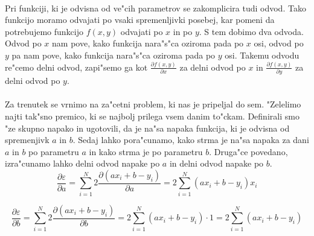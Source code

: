 \paragraph{}
Pri funkciji, ki je odvisna od ve"cih parametrov se zakomplicira tudi odvod. Tako funkcijo moramo odvajati po vsaki spremenljivki posebej, kar pomeni da potrebujemo funkcijo $f(x,y)$ odvajati po $x$ in po $y$. S tem dobimo dva odvoda. Odvod po $x$ nam pove, kako funkcija nara"s"ca oziroma pada po $x$ osi, odvod po $y$ pa nam pove, kako funkcija nara"s"ca oziroma pada po $y$ osi. Takemu odvodu re"cemo delni odvod, zapi"semo ga kot $\frac{\partial f(x,y)}{\partial x}$ za delni odvod po $x$ in $\frac{\partial f(x,y)}{\partial y}$ za delni odvod po $y$.

\paragraph{}
Za trenutek se vrnimo na za"cetni problem, ki nas je pripeljal do sem. "Zelelimo najti tak"sno premico, ki se najbolj prilega vsem danim to"ckam. Definirali smo "ze skupno napako in ugotovili, da je na"sa napaka funkcija, ki je odvisna od spremenjivk $a$ in $b$. Sedaj lahko pora"cunamo, kako strma je na"sa napaka za dani $a$ in $b$ po parametru $a$ in kako strma je po parametru $b$. Druga"ce povedano, izra"cunamo lahko delni odvod napake po $a$ in delni odvod napake po $b$.
$$\frac{\partial \varepsilon}{\partial a} =
\sum_{i=1}^{N} 2 \frac{\partial (a x_i + b - y_i)}{\partial a} =
2 \sum_{i=1}^{N} (a x_i + b - y_i)x_i$$

$$\frac{\partial \varepsilon}{\partial b} =
\sum_{i=1}^{N} 2 \frac{\partial (a x_i + b - y_i)}{\partial b} =
2 \sum_{i=1}^{N} (a x_i + b - y_i)\cdot1 = 2 \sum_{i=1}^{N} (a x_i + b - y_i)$$